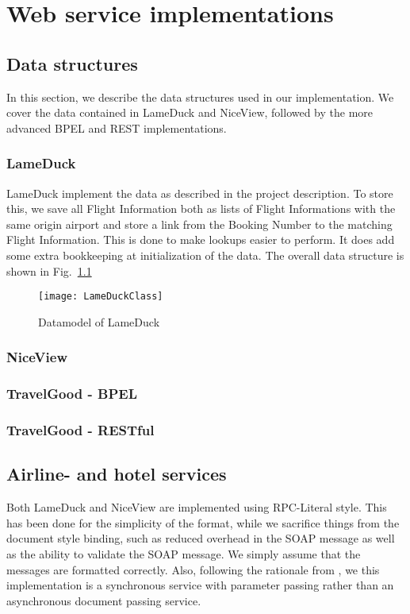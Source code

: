 {\setlength{\chapterfontsize}{23pt}
\chapter{Web service implementations}
}

\section{Data structures}
In this section, we describe the data structures used in our implementation. We cover the data contained in LameDuck and NiceView, followed by the more advanced BPEL and REST implementations.

\subsection{LameDuck}
LameDuck implement the data as described in the project description. To store this, we save all Flight Information both as lists of Flight Informations with the same origin airport and store a link from the Booking Number to the matching Flight Information. This is done to make lookups easier to perform. It does add some extra bookkeeping at initialization of the data. The overall data structure is shown in Fig.~\ref{fig:lameduck_class}

\begin{figure}[H]
\centering
\texttt{[image: LameDuckClass]}
\caption{Datamodel of LameDuck}
\label{fig:lameduck_class}
\end{figure}

\subsection{NiceView}
\subsection{TravelGood - BPEL}

\subsection{TravelGood - RESTful}
\section{Airline- and hotel services}
Both LameDuck and NiceView are implemented using RPC-Literal style. This has been done for the simplicity of the format, while we sacrifice things from the document style binding, such as reduced overhead in the SOAP message as well as the ability to validate the SOAP message. We simply assume that the messages are formatted correctly.
Also, following the rationale from \cite{papazoglou2008web}, we this implementation is a synchronous service with parameter passing rather than an asynchronous document passing service.

